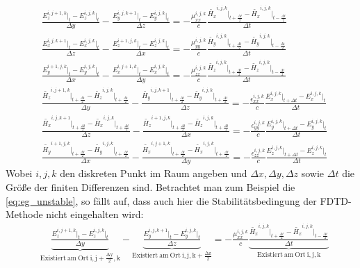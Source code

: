 \documentclass[11pt, ngerman]{article}
\begin{document}
\begin{align}
	&\frac{E_z^{i,j+1,k}\vert_t - E_z^{i,j,k}\vert_t}{\Delta y} - \frac{E_y^{i,j,k+1}\vert_t - E_y^{i,j,k}\vert_t}{\Delta z}
	= -\frac{\mu_{xx}^{i,j,k}}{c}\frac{\widetilde{H_x}^{i,j,k}\vert_{t+\frac{\Delta t}{2}} - \widetilde{H_x}^{i,j,k}\vert_{t-\frac{\Delta t}{2}}}{\Delta t}\label{eq:eg_unstable}\\
	&\frac{E_x^{i,j,k+1}\vert_t - E_x^{i,j,k}\vert_t}{\Delta z} - \frac{E_z^{i+1,j,k}\vert_t - E_z^{i,j,k}\vert_t}{\Delta x}
	= -\frac{\mu_{yy}^{i,j,k}}{c}\frac{\widetilde{H_y}^{i,j,k}\vert_{t+\frac{\Delta t}{2}} - \widetilde{H_y}^{i,j,k}\vert_{t-\frac{\Delta t}{2}}}{\Delta t}\\
	&\frac{E_y^{i+1,j,k}\vert_t - E_y^{i,j,k}\vert_t}{\Delta x} - \frac{E_x^{i,j+1,k}\vert_t - E_x^{i,j,k}\vert_t}{\Delta y}
	= -\frac{\mu_{zz}^{i,j,k}}{c}\frac{\widetilde{H_z}^{i,j,k}\vert_{t+\frac{\Delta t}{2}} - \widetilde{H_z}^{i,j,k}\vert_{t-\frac{\Delta t}{2}}}{\Delta t}\\
	&\frac{\widetilde{H_z}^{i,j+1,k}\vert_{t+\frac{\Delta t}{2}} - \widetilde{H_z}^{i,j,k}\vert_{t+\frac{\Delta t}{2}}}{\Delta y}
	- \frac{\widetilde{H_y}^{i,j,k+1}\vert_{t+\frac{\Delta t}{2}} - \widetilde{H_y}^{i,j,k}\vert_{t+\frac{\Delta t}{2}}}{\Delta z}
	= -\frac{\epsilon_{xx}^{i,j,k}}{c}\frac{E_x^{i,j,k}\vert_{t+\Delta t} - E_x^{i,j,k}\vert_t}{\Delta t}\\
	&\frac{\widetilde{H_x}^{i,j,k+1}\vert_{t+\frac{\Delta t}{2}} - \widetilde{H_x}^{i,j,k}\vert_{t+\frac{\Delta t}{2}}}{\Delta z}
	- \frac{\widetilde{H_z}^{i+1,j,k}\vert_{t+\frac{\Delta t}{2}} - \widetilde{H_z}^{i,j,k}\vert_{t+\frac{\Delta t}{2}}}{\Delta x}
	= -\frac{\epsilon_{yy}^{i,j,k}}{c}\frac{E_y^{i,j,k}\vert_{t+\Delta t} - E_y^{i,j,k}\vert_t}{\Delta t}\\
	&\frac{\widetilde{H_y}^{i+1,j,k}\vert_{t+\frac{\Delta t}{2}} - \widetilde{H_y}^{i,j,k}\vert_{t+\frac{\Delta t}{2}}}{\Delta x}
	- \frac{\widetilde{H_x}^{i,j+1,k}\vert_{t+\frac{\Delta t}{2}} - \widetilde{H_x}^{i,j,k}\vert_{t+\frac{\Delta t}{2}}}{\Delta y}
	= -\frac{\epsilon_{zz}^{i,j,k}}{c}\frac{E_z^{i,j,k}\vert_{t+\Delta t} - E_z^{i,j,k}\vert_t}{\Delta t}
\end{align}
Wobei \(i,j,k\) den diskreten Punkt im Raum angeben und \(\Delta x, \Delta y, \Delta z\) sowie \(\Delta t\) die Gr\"o{\ss}e der finiten Differenzen sind.
Betrachtet man zum Beispiel die \cref{eq:eg_unstable}, so f\"allt auf, dass auch hier die Stabilit\"atsbedingung der FDTD-Methode nicht eingehalten wird:
\begin{align}
	&\underbrace{\frac{E_z^{i,j+1,k}\vert_t - E_z^{i,j,k}\vert_t}{\Delta y}}_{\mathrm{Existiert\ am\ Ort\ i,j+\frac{\Delta y}{2},k}}
	-\underbrace{\frac{E_y^{i,j,k+1}\vert_t - E_y^{i,j,k}\vert_t}{\Delta z}}_{\mathrm{Existiert\ am\ Ort\ i,j,k+\frac{\Delta z}{2}}}
	= -\frac{\mu_{xx}^{i,j,k}}{c}
	\underbrace{\frac{\widetilde{H_x}^{i,j,k}\vert_{t+\frac{\Delta t}{2}} - \widetilde{H_x}^{i,j,k}\vert_{t-\frac{\Delta t}{2}}}{\Delta t}}_{\mathrm{Existiert\ am\ Ort\ i,j,k}}
\end{align}
\end{document}
